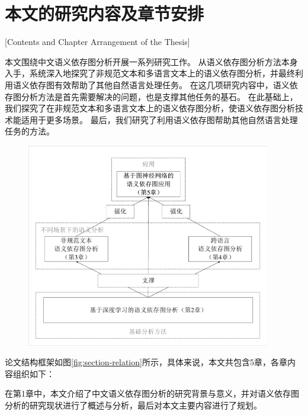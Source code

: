 




\section{本文的研究内容及章节安排}[Contents and Chapter Arrangement of the Thesis]

本文围绕中文语义依存图分析开展一系列研究工作。
从语义依存图分析方法本身入手，系统深入地探究了非规范文本和多语言文本上的语义依存图分析，并最终利用语义依存图有效帮助了其他自然语言处理任务。
在这几项研究内容中，语义依存图分析方法是首先需要解决的问题，也是支撑其他任务的基石。
在此基础上，我们探究了在非规范文本和多语言文本上的语义依存图分析，使语义依存图分析技术能适用于更多场景。
最后，我们研究了利用语义依存图帮助其他自然语言处理任务的方法。

\begin{figure}[htbp]
    \centering
    \includegraphics[width=0.95\textwidth]{figures/section-relation.pdf}
\end{figure}

论文结构框架如图\ref{fig:section-relation}所示，具体来说，本文共包含5章，各章内容组织如下：

在第1章中，本文介绍了中文语义依存图分析的研究背景与意义，并对语义依存图分析的研究现状进行了概述与分析，最后对本文主要内容进行了规划。

